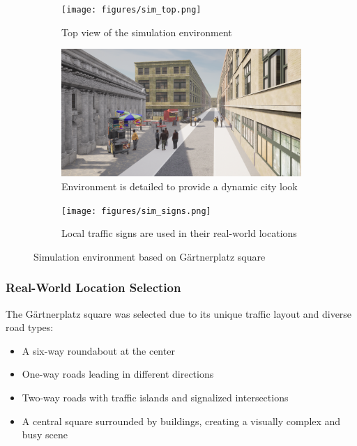 \begin{figure}[h]
    \centering
    \begin{subfigure}{\textwidth}
        \centering
        \texttt{[image: figures/sim\_top.png]}
        \caption{Top view of the simulation environment}
        \label{fig:sim_top}
    \end{subfigure}
    \begin{subfigure}{\textwidth}
        \centering
        \includegraphics[width=\textwidth, trim=0 200pt 0 200pt, clip]{figures/sim_crowd.png}
        \caption{Environment is detailed to provide a dynamic city look}
        \label{fig:sim_crowd}
    \end{subfigure}
    \begin{subfigure}{\textwidth}
        \centering
        \texttt{[image: figures/sim\_signs.png]}
        \caption{Local traffic signs are used in their real-world locations}
        \label{fig:sim_signs}
    \end{subfigure}
    \caption{Simulation environment based on Gärtnerplatz square}
    \label{fig:simulation}
\end{figure}
\FloatBarrier
\subsubsection*{Real-World Location Selection}
The Gärtnerplatz square was selected due to its unique traffic layout and diverse road types:
\begin{itemize}
    \item A six-way roundabout at the center
    \item One-way roads leading in different directions
    \item Two-way roads with traffic islands and signalized intersections
    \item A central square surrounded by buildings, creating a visually complex and busy scene
\end{itemize}

